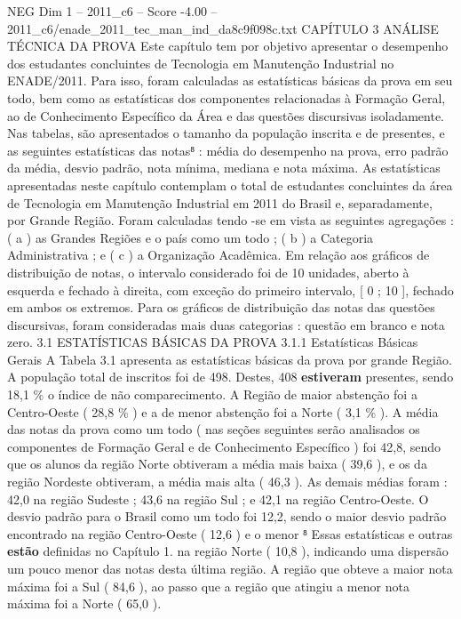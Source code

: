 \begin{textsample}{NEG Dim 1 – 2011\_c6 – Score -4.00 – 2011\_c6/enade\_2011\_tec\_man\_ind\_da8c9f098c.txt}  \label{ex:f1_neg_227}
CAPÍTULO 3 ANÁLISE TÉCNICA DA PROVA Este capítulo tem por objetivo apresentar o desempenho dos estudantes concluintes de Tecnologia em Manutenção Industrial no ENADE/2011.
Para isso, foram calculadas as estatísticas básicas da prova em seu todo, bem como as estatísticas dos componentes relacionadas à Formação Geral, ao de Conhecimento Específico da Área e das questões discursivas isoladamente.
Nas tabelas, são apresentados o tamanho da população inscrita e de presentes, e as seguintes estatísticas das notas⁸ : média do desempenho na prova, erro padrão da média, desvio padrão, nota mínima, mediana e nota máxima.
As estatísticas apresentadas neste capítulo contemplam o total de estudantes concluintes da área de Tecnologia em Manutenção Industrial em 2011 do Brasil e, separadamente, por Grande Região.
Foram calculadas tendo -se em vista as seguintes agregações : ( a ) as Grandes Regiões e o país como um todo ; ( b ) a Categoria Administrativa ; e ( c ) a Organização Acadêmica.
Em relação aos gráficos de distribuição de notas, o intervalo considerado foi de 10 unidades, aberto à esquerda e fechado à direita, com exceção do primeiro intervalo, [ 0 ; 10 ], fechado em ambos os extremos.
Para os gráficos de distribuição das notas das questões discursivas, foram consideradas mais duas categorias : questão em branco e nota zero. 3.1 ESTATÍSTICAS BÁSICAS DA PROVA 3.1.1 Estatísticas Básicas Gerais A Tabela 3.1 apresenta as estatísticas básicas da prova por grande Região.
A população total de inscritos foi de 498.
Destes, 408 \textbf{estiveram} presentes, sendo 18,1 \% o índice de não comparecimento.
A Região de maior abstenção foi a Centro-Oeste ( 28,8 \% ) e a de menor abstenção foi a Norte ( 3,1 \% ).
A média das notas da prova como um todo ( nas seções seguintes serão analisados os componentes de Formação Geral e de Conhecimento Específico ) foi 42,8, sendo que os alunos da região Norte obtiveram a média mais baixa ( 39,6 ), e os da região Nordeste obtiveram, a média mais alta ( 46,3 ).
As demais médias foram : 42,0 na região Sudeste ; 43,6 na região Sul ; e 42,1 na região Centro-Oeste.
O desvio padrão para o Brasil como um todo foi 12,2, sendo o maior desvio padrão encontrado na região Centro-Oeste ( 12,6 ) e o menor ⁸ Essas estatísticas e outras \textbf{estão} definidas no Capítulo 1. na região Norte ( 10,8 ), indicando uma dispersão um pouco menor das notas desta última região.
A região que obteve a maior nota máxima foi a Sul ( 84,6 ), ao passo que a região que atingiu a menor nota máxima foi a Norte ( 65,0 ).

\end{textsample}
